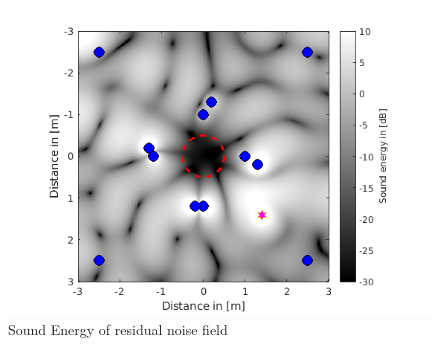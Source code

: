 \begin{figure}[H]
    \centerline{\includegraphics[width=\textwidth]{LaTeX/images/plots/ANC_1.png}}
    \caption{Sound Energy of residual noise field}
    \label{fig:ANC1}
\end{figure}

